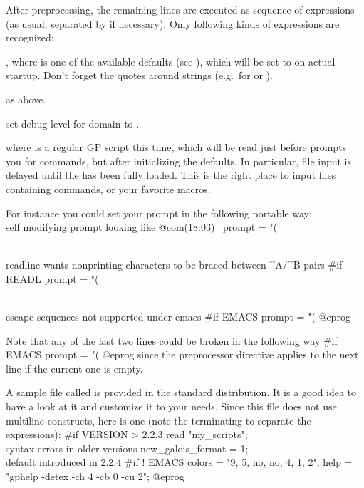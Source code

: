 After preprocessing, the remaining lines are executed as
sequence of expressions (as usual, separated by \kbd{;} if necessary). Only
following kinds of expressions are recognized:

\item {} \kbd{=} , where  is one of
the available defaults (see ), which will be set to
 on actual startup. Don't forget the quotes around strings
(e.g.~for  or ).

\item {} as above.

\item {} set debug level for domain
 to .

\item {} where 
is a regular GP script this time, which will be read just before 
prompts you for commands, but after initializing the defaults. In particular,
file input is delayed until the  has been fully loaded. This is the
right place to input files containing  commands, or your favorite
macros.

\noindent For instance you could set your prompt in the following portable way:
\bprog
\\ self modifying prompt looking like @com\hbox{\rm(18:03) \kbd{ >}}
prompt   = "(%

\\ readline wants nonprinting characters to be braced between ^A/^B pairs
#if READL prompt = "(%

\\ escape sequences not supported under emacs
#if EMACS prompt = "(%
@eprog

\noindent Note that any of the last two lines could be broken in the
following way
\bprog
#if EMACS
  prompt = "(%
@eprog
\noindent since the preprocessor directive applies to the next line if the
current one is empty.

A sample  file called  is provided in the
standard distribution. It is a good idea to have a look at it and customize
it to your needs. Since this file does not use multiline constructs, here is
one (note the terminating \kbd{;} to separate the expressions):
\bprog
#if VERSION > 2.2.3
{
  read "my_scripts";     \\ syntax errors in older versions
  new_galois_format = 1; \\ default introduced in 2.2.4
}
#if ! EMACS
{
  colors = "9, 5, no, no, 4, 1, 2";
  help   = "gphelp -detex -ch 4 -cb 0 -cu 2";
}
@eprog

